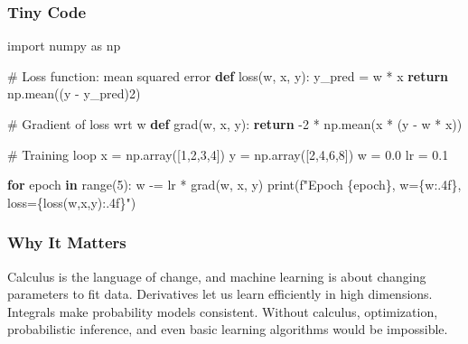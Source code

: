 \documentclass[
  letterpaper,
  DIV=11,
  numbers=noendperiod]{scrreprt}
\newenvironment{Shaded}{\begin{snugshade}}{\end{snugshade}}
\newcommand{\BuiltInTok}[1]{\textcolor[rgb]{0.00,0.23,0.31}{#1}}
\newcommand{\CommentTok}[1]{\textcolor[rgb]{0.37,0.37,0.37}{#1}}
\newcommand{\ControlFlowTok}[1]{\textcolor[rgb]{0.00,0.23,0.31}{\textbf{#1}}}
\newcommand{\DecValTok}[1]{\textcolor[rgb]{0.68,0.00,0.00}{#1}}
\newcommand{\FloatTok}[1]{\textcolor[rgb]{0.68,0.00,0.00}{#1}}
\newcommand{\ImportTok}[1]{\textcolor[rgb]{0.00,0.46,0.62}{#1}}
\newcommand{\KeywordTok}[1]{\textcolor[rgb]{0.00,0.23,0.31}{\textbf{#1}}}
\newcommand{\NormalTok}[1]{\textcolor[rgb]{0.00,0.23,0.31}{#1}}
\newcommand{\OperatorTok}[1]{\textcolor[rgb]{0.37,0.37,0.37}{#1}}
\newcommand{\SpecialCharTok}[1]{\textcolor[rgb]{0.37,0.37,0.37}{#1}}
\newcommand{\SpecialStringTok}[1]{\textcolor[rgb]{0.13,0.47,0.30}{#1}}
\begin{document}
\subsubsection{Tiny Code}\label{tiny-code-119}

\begin{Shaded}
\begin{Highlighting}[]
\ImportTok{import}\NormalTok{ numpy }\ImportTok{as}\NormalTok{ np}

\CommentTok{\# Loss function: mean squared error}
\KeywordTok{def}\NormalTok{ loss(w, x, y):}
\NormalTok{    y\_pred }\OperatorTok{=}\NormalTok{ w }\OperatorTok{*}\NormalTok{ x}
    \ControlFlowTok{return}\NormalTok{ np.mean((y }\OperatorTok{{-}}\NormalTok{ y\_pred)}\DecValTok{2}\NormalTok{)}

\CommentTok{\# Gradient of loss wrt w}
\KeywordTok{def}\NormalTok{ grad(w, x, y):}
    \ControlFlowTok{return} \OperatorTok{{-}}\DecValTok{2} \OperatorTok{*}\NormalTok{ np.mean(x }\OperatorTok{*}\NormalTok{ (y }\OperatorTok{{-}}\NormalTok{ w }\OperatorTok{*}\NormalTok{ x))}

\CommentTok{\# Training loop}
\NormalTok{x }\OperatorTok{=}\NormalTok{ np.array([}\DecValTok{1}\NormalTok{,}\DecValTok{2}\NormalTok{,}\DecValTok{3}\NormalTok{,}\DecValTok{4}\NormalTok{])}
\NormalTok{y }\OperatorTok{=}\NormalTok{ np.array([}\DecValTok{2}\NormalTok{,}\DecValTok{4}\NormalTok{,}\DecValTok{6}\NormalTok{,}\DecValTok{8}\NormalTok{])}
\NormalTok{w }\OperatorTok{=} \FloatTok{0.0}
\NormalTok{lr }\OperatorTok{=} \FloatTok{0.1}

\ControlFlowTok{for}\NormalTok{ epoch }\KeywordTok{in} \BuiltInTok{range}\NormalTok{(}\DecValTok{5}\NormalTok{):}
\NormalTok{    w }\OperatorTok{{-}=}\NormalTok{ lr }\OperatorTok{*}\NormalTok{ grad(w, x, y)}
    \BuiltInTok{print}\NormalTok{(}\SpecialStringTok{f"Epoch }\SpecialCharTok{\{}\NormalTok{epoch}\SpecialCharTok{\}}\SpecialStringTok{, w=}\SpecialCharTok{\{}\NormalTok{w}\SpecialCharTok{:.4f\}}\SpecialStringTok{, loss=}\SpecialCharTok{\{}\NormalTok{loss(w,x,y)}\SpecialCharTok{:.4f\}}\SpecialStringTok{"}\NormalTok{)}
\end{Highlighting}
\end{Shaded}

\subsubsection{Why It Matters}\label{why-it-matters-17}

Calculus is the language of change, and machine learning is about
changing parameters to fit data. Derivatives let us learn efficiently in
high dimensions. Integrals make probability models consistent. Without
calculus, optimization, probabilistic inference, and even basic learning
algorithms would be impossible.
\end{document}
